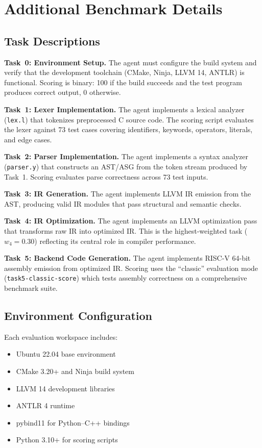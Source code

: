 \section{Additional Benchmark Details}

\subsection{Task Descriptions}

\textbf{Task~0: Environment Setup.}
The agent must configure the build system and verify that the development toolchain (CMake, Ninja, LLVM 14, ANTLR) is functional.
Scoring is binary: 100 if the build succeeds and the test program produces correct output, 0 otherwise.

\textbf{Task~1: Lexer Implementation.}
The agent implements a lexical analyzer (\texttt{lex.l}) that tokenizes preprocessed C source code.
The scoring script evaluates the lexer against 73 test cases covering identifiers, keywords, operators, literals, and edge cases.

\textbf{Task~2: Parser Implementation.}
The agent implements a syntax analyzer (\texttt{parser.y}) that constructs an AST/ASG from the token stream produced by Task~1.
Scoring evaluates parse correctness across 73 test inputs.

\textbf{Task~3: IR Generation.}
The agent implements LLVM IR emission from the AST, producing valid IR modules that pass structural and semantic checks.

\textbf{Task~4: IR Optimization.}
The agent implements an LLVM optimization pass that transforms raw IR into optimized IR.
This is the highest-weighted task ($w_4 = 0.30$) reflecting its central role in compiler performance.

\textbf{Task~5: Backend Code Generation.}
The agent implements RISC-V 64-bit assembly emission from optimized IR.
Scoring uses the ``classic'' evaluation mode (\texttt{task5-classic-score}) which tests assembly correctness on a comprehensive benchmark suite.

\subsection{Environment Configuration}

Each evaluation workspace includes:
\begin{itemize}[nosep]
\item Ubuntu 22.04 base environment
\item CMake 3.20+ and Ninja build system
\item LLVM 14 development libraries
\item ANTLR 4 runtime
\item pybind11 for Python--C++ bindings
\item Python 3.10+ for scoring scripts
\end{itemize}

